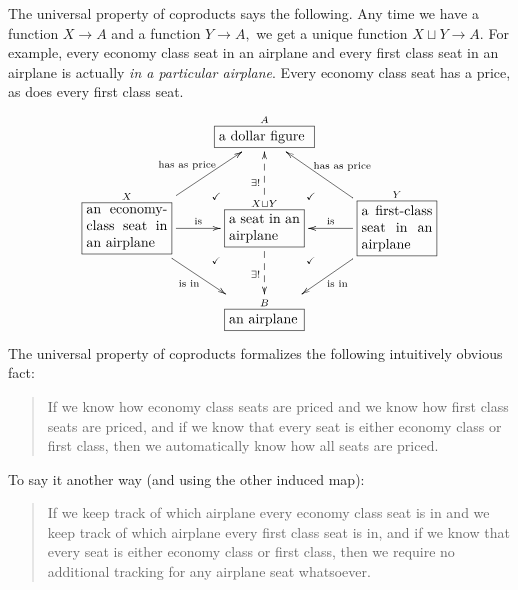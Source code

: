 \documentclass[../main/CT4S-EN-RU]{subfiles}
\begin{document}
\begin{exampleENG}
The universal property of coproducts says the following. Any time we have a function $X{→} A$ and a function $Y{→} A,$ we get a unique function $X\sqcup Y{→} A.$ For example, every economy class seat in an airplane and every first class seat in an airplane is actually {\em in a particular airplane}. Every economy class seat has a price, as does every first class seat.
\begin{align}
\xymatrix{
&\obox{A}{.9in}{a dollar figure}&\\
\obox{X}{.8in}{an economy-class seat in an airplane}\LA{ru}{has as price}\LA{r}{is}\LAL{dr}{is in}&\obox{X\sqcup Y}{.7in}{a seat in an airplane}\ar@{-->}[d]_{\exists!}\ar@{-->}[u]^{\exists!}\ar@{}[ur]|(.35){\checkmark}\ar@{}[dl]|(.35){\checkmark}\ar@{}[dr]|(.35){\checkmark}\ar@{}[ul]|(.35){\checkmark}&\obox{Y}{.7in}{a first-class seat in an airplane}\LAL{l}{is}\LAL{lu}{has as price}\LA{dl}{is in}\\
&\obox{B}{.7in}{an airplane}&
}
\end{align}
The universal property of coproducts formalizes the following intuitively obvious fact:
\begin{quote}
If we know how economy class seats are priced and we know how first class seats are priced, and if we know that every seat is either economy class or first class, then we automatically know how all seats are priced.
\end{quote}
To say it another way (and using the other induced map):
\begin{quote}
If we keep track of which airplane every economy class seat is in and we keep track of which airplane every first class seat is in, and if we know that every seat is either economy class or first class, then we require no additional tracking for any airplane seat whatsoever.
\end{quote}
\end{exampleENG}
\end{document}
